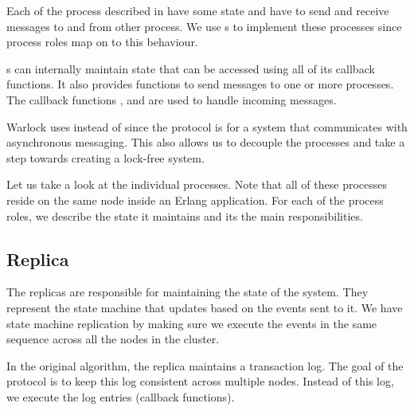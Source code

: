 Each of the process described in  have some state
and have to send and receive messages to and from other process. We use 
s
 to implement these processes since process roles map
on to this behaviour.

s can internally maintain state that can be accessed using
all of its
callback functions. It also provides functions to send messages%
to one or more processes. The callback functions %
, %
 and %
are used to handle incoming messages.

Warlock uses  instead of  since the
protocol is
for a system that communicates with asynchronous messaging. This also allows us
to decouple the processes and take a step towards creating a lock-free system.

Let us take a look at the individual  processes. Note
that all of these processes reside on the same node inside an
Erlang application. For each of the process roles, we describe the state
it maintains and its the main responsibilities.

\subsection{Replica}

The replicas are responsible for maintaining the state of the system. They
represent the state machine that updates based on the events sent to it. We
have state machine replication by making sure we execute the events in the same
sequence across all the nodes in the cluster.

In the original algorithm, the replica maintains a transaction log. The goal of
the protocol is to keep this log consistent across multiple nodes. Instead of
this log, we execute the log entries (callback functions).

